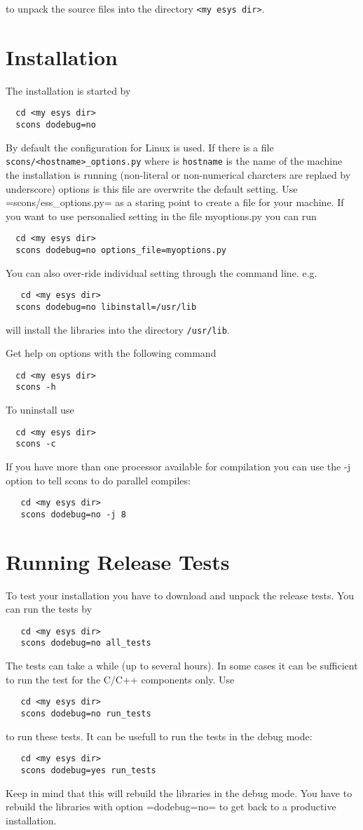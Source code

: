 to unpack the source files into the directory \verb|<my esys dir>|.

\section{Installation}

The installation is started by 
\begin{verbatim}
  cd <my esys dir>
  scons dodebug=no
\end{verbatim}
By default the configuration for Linux is used. If there is a file \verb|scons/<hostname>_options.py| where is \verb|hostname| is the name of the machine the installation is running (non-literal or non-numerical charcters are replaed by underscore)  options is this file are overwrite the default setting. Use =scons/ess_options.py= as a staring point to create a file for your machine. If you want to use personalied setting in the file myoptions.py you can run
\begin{verbatim}
  cd <my esys dir>
  scons dodebug=no options_file=myoptions.py
\end{verbatim}
You can also over-ride individual setting through the command line. e.g.
\begin{verbatim}
   cd <my esys dir>
  scons dodebug=no libinstall=/usr/lib
\end{verbatim}
will install the libraries into the directory \verb|/usr/lib|. 

Get help on options with the following command
\begin{verbatim}
  cd <my esys dir>
  scons -h
\end{verbatim}
To uninstall use
\begin{verbatim}
  cd <my esys dir>
  scons -c
\end{verbatim}

If you have more than one processor available for compilation you can use the -j option to tell scons to do parallel compiles:
\begin{verbatim}
   cd <my esys dir>
   scons dodebug=no -j 8
\end{verbatim}
\section{Running Release Tests}
To test your installation you have to download and unpack the release tests. You can run the tests by
\begin{verbatim}
   cd <my esys dir>
   scons dodebug=no all_tests
\end{verbatim}
The tests can take a while (up to several hours). In some cases it can be sufficient to run the test for the C/C++ components only. Use  
\begin{verbatim}
   cd <my esys dir>
   scons dodebug=no run_tests
\end{verbatim}
to run these tests.
It can be usefull to run the tests in the debug mode:
\begin{verbatim}
   cd <my esys dir>
   scons dodebug=yes run_tests
\end{verbatim}
Keep in mind that this will rebuild the libraries in the debug mode. You have to rebuild the libraries with option =dodebug=no= to get back to a productive installation.


